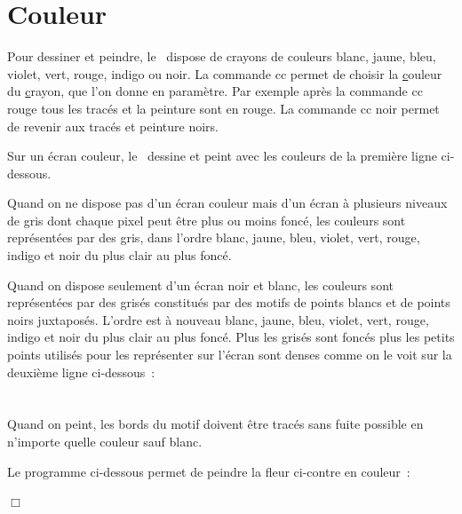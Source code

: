 \section{Couleur}

Pour dessiner et peindre, le \robot\ dispose de crayons de couleurs blanc, jaune, bleu, violet, vert, 
rouge, indigo ou noir. La commande {\idt cc} permet de choisir la \underline{c}ouleur du 
\underline{c}rayon, que l'on donne en paramètre. Par exemple après la commande {\idt cc rouge} 
tous les tracés et la peinture sont en rouge. La commande {\idt cc noir} permet de
revenir aux tracés et peinture noirs.

Sur un écran couleur, le \robot\ dessine et peint avec les couleurs de la première
ligne ci-dessous.

Quand on ne dispose pas d'un écran couleur mais d'un écran à plusieurs niveaux de gris
dont chaque pixel peut être plus ou moins foncé, les
couleurs sont représentées par des gris, dans l'ordre blanc, 
jaune, bleu, violet, vert,  rouge, indigo et noir du plus clair au plus foncé.

Quand on dispose seulement d'un écran noir et blanc, les couleurs sont représentées par des
grisés constitués par des motifs de points blancs et de points noirs juxtaposés. L'ordre est
à nouveau blanc, 
jaune, bleu, violet, vert,  rouge, indigo et noir du plus clair au plus foncé. Plus les grisés sont
foncés plus les petits points utilisés pour les représenter sur l'écran sont denses comme
on le voit sur la deuxième ligne ci-dessous~:\\[1.8cm]
\ \\[1.8cm]
\ \\

Quand on peint, les bords du motif doivent être tracés sans fuite possible en n'importe quelle couleur sauf blanc. 

\begin{exemple}{\rm
 Le programme ci-dessous permet de peindre la fleur ci-contre en couleur~:\\[5cm]
 \vspace*{-5cm}
 
\noindent $\Box$ }\end{exemple}

